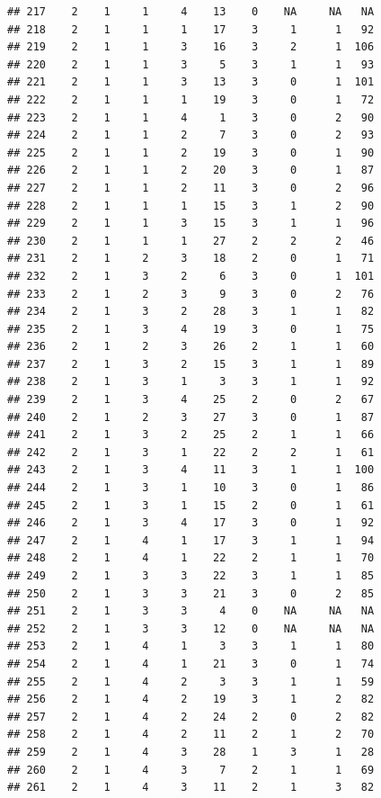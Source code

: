 \documentclass[krantz2]{krantz}\usepackage{knitr}%
\begin{document}
\begin{knitrout}
\begin{kframe}
\begin{verbatim}
## 217    2    1     1     4    13    0    NA     NA   NA
## 218    2    1     1     1    17    3     1      1   92
## 219    2    1     1     3    16    3     2      1  106
## 220    2    1     1     3     5    3     1      1   93
## 221    2    1     1     3    13    3     0      1  101
## 222    2    1     1     1    19    3     0      1   72
## 223    2    1     1     4     1    3     0      2   90
## 224    2    1     1     2     7    3     0      2   93
## 225    2    1     1     2    19    3     0      1   90
## 226    2    1     1     2    20    3     0      1   87
## 227    2    1     1     2    11    3     0      2   96
## 228    2    1     1     1    15    3     1      2   90
## 229    2    1     1     3    15    3     1      1   96
## 230    2    1     1     1    27    2     2      2   46
## 231    2    1     2     3    18    2     0      1   71
## 232    2    1     3     2     6    3     0      1  101
## 233    2    1     2     3     9    3     0      2   76
## 234    2    1     3     2    28    3     1      1   82
## 235    2    1     3     4    19    3     0      1   75
## 236    2    1     2     3    26    2     1      1   60
## 237    2    1     3     2    15    3     1      1   89
## 238    2    1     3     1     3    3     1      1   92
## 239    2    1     3     4    25    2     0      2   67
## 240    2    1     2     3    27    3     0      1   87
## 241    2    1     3     2    25    2     1      1   66
## 242    2    1     3     1    22    2     2      1   61
## 243    2    1     3     4    11    3     1      1  100
## 244    2    1     3     1    10    3     0      1   86
## 245    2    1     3     1    15    2     0      1   61
## 246    2    1     3     4    17    3     0      1   92
## 247    2    1     4     1    17    3     1      1   94
## 248    2    1     4     1    22    2     1      1   70
## 249    2    1     3     3    22    3     1      1   85
## 250    2    1     3     3    21    3     0      2   85
## 251    2    1     3     3     4    0    NA     NA   NA
## 252    2    1     3     3    12    0    NA     NA   NA
## 253    2    1     4     1     3    3     1      1   80
## 254    2    1     4     1    21    3     0      1   74
## 255    2    1     4     2     3    3     1      1   59
## 256    2    1     4     2    19    3     1      2   82
## 257    2    1     4     2    24    2     0      2   82
## 258    2    1     4     2    11    2     1      2   70
## 259    2    1     4     3    28    1     3      1   28
## 260    2    1     4     3     7    2     1      1   69
## 261    2    1     4     3    11    2     1      3   82

\end{verbatim}
\end{kframe}
\end{knitrout}
\end{document}
